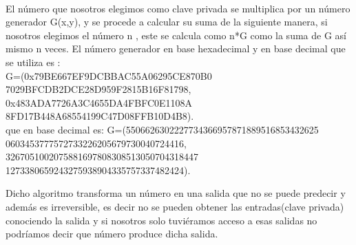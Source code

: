 \documentclass{rbf}
\begin{document}
\\
El número que nosotros elegimos como clave privada se multiplica por un número generador G(x,y), y se procede a calcular su suma de la siguiente manera, si nosotros elegimos el número n , este se calcula como n*G como la suma de G así mismo n veces. El número generador en base hexadecimal y en base decimal que se utiliza es :
\\
{\small
G=(0x79BE667EF9DCBBAC55A06295CE870B0
\\7029BFCDB2DCE28D959F2815B16F81798,
\\0x483ADA7726A3C4655DA4FBFC0E1108A
8FD17B448A68554199C47D08FFB10D4B8).\\

}
que en base decimal es:
{\small
G=(5506626302227734366957871889516853432625
0603453777572733226205679730040724416, 
\\3267051002075881697808308513050704318447
1273380659243275938904335757337482424).\\

}

Dicho algoritmo transforma un número en una salida que no se puede predecir y además es irreversible, es decir no se pueden obtener las entradas(clave privada) conociendo la salida y si nosotros solo tuviéramos acceso a esas salidas no podríamos decir que número produce dicha salida.
\end{document}
